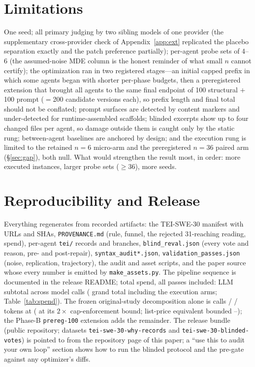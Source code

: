 \documentclass[11pt]{article}
\begin{document}
\section{Limitations}
\label{sec:limitations}
One seed; all primary judging by two sibling models of one provider (the
supplementary cross-provider check of Appendix~\ref{app:ext} replicated the
placebo separation exactly and the patch preference partially); per-agent
probe sets of 4--6 (the assumed-noise MDE column is the honest reminder of
what small $n$ cannot certify); the optimization ran in two registered stages---an
initial capped prefix in which some agents began with shorter per-phase budgets,
then a preregistered extension that brought all \swN{} agents to the same final
endpoint of 100 structural $+$ 100 prompt ($=$200 candidate versions each), so
prefix length and final total should not be conflated; prompt surfaces are detected by content
markers and under-detected for runtime-assembled scaffolds; blinded excerpts
show up to four changed files per agent, so damage outside them is caught
only by the static rung; between-agent baselines are anchored by design; and
the execution rung is limited to the retained $n{=}6$ micro-arm and the
preregistered $n{=}36$ paired arm (\S\ref{sec:gap}), both null. What would
strengthen the result most, in order: more executed instances, larger probe
sets ($\ge$36), more seeds.

\section{Reproducibility and Release}
\label{sec:repro}
Everything regenerates from recorded artifacts: the TEI-SWE-30 manifest with
URLs and SHAs, \texttt{PROVENANCE.md} (rule, funnel, the rejected
31-reaching reading, spend), per-agent \texttt{tei/} records and branches,
\texttt{blind\_reval.json} (every vote and reason, pre- and post-repair),
\texttt{syntax\_audit*.json}, \texttt{validation\_passes.json} (noise,
replication, trajectory), the audit and asset scripts, and the paper source
whose every number is emitted by \texttt{make\_assets.py}. The pipeline
sequence is documented in the release README; total spend, all passes
included: \swLLMCombined{} LLM subtotal across \swCallsCanon{} model calls
(\swGrandTotal{} grand total including the execution arms; Table~\ref{tab:spend}).
The frozen original-study decomposition alone is \swCallsAll{} calls /
\swTokIn/\swTokOut{} tokens at \swLLMTotal{} (\swLLMTotalCons{} at its
$2\times$ cap-enforcement bound; list-price equivalent bounded
\swCostListLo--\swCostListHi); the Phase-B \texttt{prereg-100} extension adds
the remainder. The release bundle (public
repository; datasets \texttt{tei-swe-30-why-records} and
\texttt{tei-swe-30-blinded-votes}) is pointed to from the repository page of
this paper; a ``use this to audit your own loop'' section shows how to run
the blinded protocol and the pre-gate against any optimizer's diffs.
\end{document}
